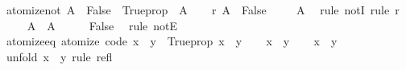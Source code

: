 \begin{isabellebody}
\isanewline
%
\endisadelimproof
\isanewline
{}\isamarkupfalse%
\ atomize{\isacharunderscore}{\kern0pt}not{\isacharcolon}{\kern0pt}\ {\isachardoublequoteopen}{\isacharparenleft}{\kern0pt}A\ {\isasymLongrightarrow}\ False{\isacharparenright}{\kern0pt}\ {\isasymequiv}\ Trueprop\ {\isacharparenleft}{\kern0pt}{\isasymnot}\ A{\isacharparenright}{\kern0pt}{\isachardoublequoteclose}\isanewline
%
\isadelimproof
%
\endisadelimproof
%
\isatagproof
{}\isamarkupfalse%
\isanewline
\ \ \isamarkupfalse%
\ r{\isacharcolon}{\kern0pt}\ {\isachardoublequoteopen}A\ {\isasymLongrightarrow}\ False{\isachardoublequoteclose}\isanewline
\ \ \isamarkupfalse%
\ {\isachardoublequoteopen}{\isasymnot}\ A{\isachardoublequoteclose}\ \isamarkupfalse%
\ {\isacharparenleft}{\kern0pt}rule\ notI{\isacharparenright}{\kern0pt}\ {\isacharparenleft}{\kern0pt}rule\ r{\isacharparenright}{\kern0pt}\isanewline
{}\isamarkupfalse%
\isanewline
\ \ \isamarkupfalse%
\ {\isachardoublequoteopen}{\isasymnot}\ A{\isachardoublequoteclose}\ \ A\isanewline
\ \ \isamarkupfalse%
\ \isamarkupfalse%
\ False\ \isamarkupfalse%
\ {\isacharparenleft}{\kern0pt}rule\ notE{\isacharparenright}{\kern0pt}\isanewline
{}\isamarkupfalse%
%
\endisatagproof
{\isafoldproof}%
%
\isadelimproof
\isanewline
%
\endisadelimproof
\isanewline
{}\isamarkupfalse%
\ atomize{\isacharunderscore}{\kern0pt}eq\ {\isacharbrackleft}{\kern0pt}atomize{\isacharcomma}{\kern0pt}\ code{\isacharbrackright}{\kern0pt}{\isacharcolon}{\kern0pt}\ {\isachardoublequoteopen}{\isacharparenleft}{\kern0pt}x\ {\isasymequiv}\ y{\isacharparenright}{\kern0pt}\ {\isasymequiv}\ Trueprop\ {\isacharparenleft}{\kern0pt}x\ {\isacharequal}{\kern0pt}\ y{\isacharparenright}{\kern0pt}{\isachardoublequoteclose}\isanewline
%
\isadelimproof
%
\endisadelimproof
%
\isatagproof
{}\isamarkupfalse%
\isanewline
\ \ \isamarkupfalse%
\ {\isachardoublequoteopen}x\ {\isasymequiv}\ y{\isachardoublequoteclose}\isanewline
\ \ \isamarkupfalse%
\ {\isachardoublequoteopen}x\ {\isacharequal}{\kern0pt}\ y{\isachardoublequoteclose}\ \isamarkupfalse%
\ {\isacharparenleft}{\kern0pt}unfold\ {\isacartoucheopen}x\ {\isasymequiv}\ y{\isacartoucheclose}{\isacharparenright}{\kern0pt}\ {\isacharparenleft}{\kern0pt}rule\ refl{\isacharparenright}{\kern0pt}\isanewline
{}\isamarkupfalse%
\isanewline
\ \ \isamarkupfalse%

\end{isabellebody}
